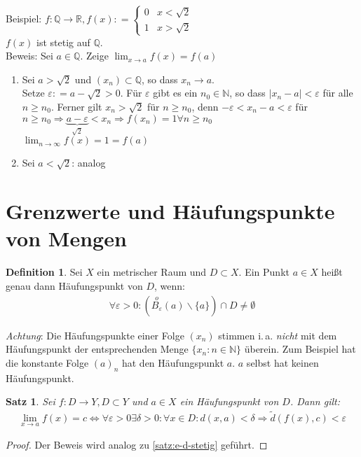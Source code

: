 \documentclass[ngerman,titlepage,twoside, parskip=half*]{scrreprt}
\newcommand*{\N}{\mathbb{N}}
\newcommand*{\Q}{\mathbb{Q}}
\newcommand*{\R}{\mathbb{R}}
\theoremstyle{plain}
\newtheorem{theorem}{Satz}[section]
\theoremstyle{definition}
\newtheorem{definition}{Definition}
\theoremstyle{remark}
\newcommand*{\abs}[2][]{#1\lvert#2#1\rvert}
\newcommand*{\coloneqq}{\mathrel{\mathop:}=}
\begin{document}
Beispiel: $f\colon\Q\rightarrow\R , f(x)\coloneqq\begin{cases}0 & x<\sqrt{2}\\1 & x>\sqrt{2}\end{cases}$\\
$f(x)$ ist stetig auf $\Q$.\\
Beweis: Sei $a\in \Q$. Zeige $\lim_{x\rightarrow a} f(x)=f(a)$
\begin{enumerate}[1. F{a}ll]
\item Sei $a>\sqrt{2}$ und $(x_n)\subset \Q$, so dass $x_n\rightarrow a$.\\
  Setze $\varepsilon \coloneqq a-\sqrt{2}>0$. Für $\varepsilon$ gibt es ein
  $n_0\in \N$, so dass $\abs{x_n-a} <\varepsilon$ für alle $n\geq
  n_0$. Ferner gilt $x_n>\sqrt{2}$ für $n\geq n_0$, denn $-\varepsilon
  <x_n-a<\varepsilon$ für $n\geq n_0 \Rightarrow
  \underbrace{a-\varepsilon}_{\sqrt{2}} <x_n
  \Rightarrow f(x_n)=1 \forall n\geq n_0$\\
  $\lim_{n\rightarrow \infty} f(x)=1=f(a)$
\item Sei $a<\sqrt{2}$: analog
\end{enumerate}

\section{Grenzwerte und Häufungspunkte von Mengen}
\begin{definition}
  Sei $X$ ein metrischer Raum und $D\subset X$. Ein Punkt $a\in X$
  heißt genau dann Häufungspunkt von $D$, wenn:
  \begin{gather*}\forall \varepsilon >0\colon
  \left(\stackrel{o}{B_{\varepsilon}}(a)\backslash \{a\} \right)\cap D
  \neq \emptyset\end{gather*}
\end{definition}
\emph{Achtung}: Die Häufungspunkte einer Folge $(x_n)$ stimmen
i.\,a. \emph{nicht} mit dem Häufungspunkt der entsprechenden Menge
$\{x_n\colon n\in\N\}$ überein. Zum Beispiel hat die konstante Folge $(a)_n$
hat den Häufungspunkt $a$. $a$ selbst hat keinen Häufungspunkt.

\begin{theorem}
  Sei $f\colon D\rightarrow Y, D\subset Y$ und $a\in X$ ein Häufungspunkt
  von $D$. Dann gilt:
  \begin{gather*}\lim_{x\rightarrow a} f(x)=c\Leftrightarrow \forall\varepsilon >0
  \exists \delta >0\colon\forall x\in D\colon d(x,a) <\delta \Rightarrow
  \tilde{d}(f(x),c)<\varepsilon\end{gather*}
\end{theorem}
\begin{proof}
  Der Beweis wird analog zu \autoref{satz:e-d-stetig} geführt.
\end{proof}
\end{document}
